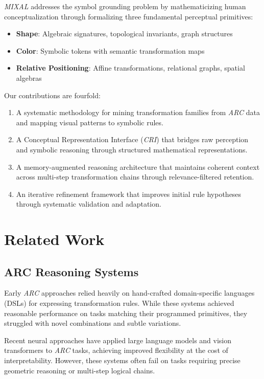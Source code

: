 \documentclass[12pt]{article}
\newcommand{\arc}{\textit{ARC}}
\newcommand{\MIXAL}{\textit{MIXAL}}
\newcommand{\cri}{\textit{CRI}}
\begin{document}
\MIXAL{} addresses the symbol grounding problem by mathematicizing human conceptualization through formalizing three fundamental perceptual primitives:
\begin{itemize}[noitemsep,topsep=0pt]
\item \textbf{Shape}: Algebraic signatures, topological invariants, graph structures
\item \textbf{Color}: Symbolic tokens with semantic transformation maps
\item \textbf{Relative Positioning}: Affine transformations, relational graphs, spatial algebras
\end{itemize}

Our contributions are fourfold:
\begin{enumerate}[noitemsep,topsep=0pt]
\item A systematic methodology for mining transformation families from \arc{} data and mapping visual patterns to symbolic rules.
\item A Conceptual Representation Interface (\cri{}) that bridges raw perception and symbolic reasoning through structured mathematical representations.
\item A memory-augmented reasoning architecture that maintains coherent context across multi-step transformation chains through relevance-filtered retention.
\item An iterative refinement framework that improves initial rule hypotheses through systematic validation and adaptation.
\end{enumerate}

\section{Related Work}

\subsection{ARC Reasoning Systems}

Early \arc{} approaches relied heavily on hand-crafted domain-specific languages (DSLs) for expressing transformation rules. While these systems achieved reasonable performance on tasks matching their programmed primitives, they struggled with novel combinations and subtle variations.

Recent neural approaches have applied large language models and vision transformers to \arc{} tasks, achieving improved flexibility at the cost of interpretability. However, these systems often fail on tasks requiring precise geometric reasoning or multi-step logical chains.
\end{document}
